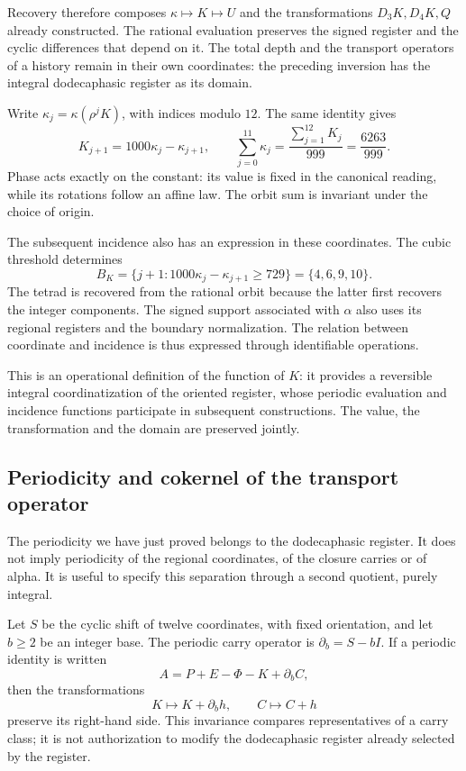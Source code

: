 Recovery therefore composes \(\kappa\mapsto K\mapsto U\)
and the transformations \(D_3K,D_4K,Q\) already constructed. The rational
evaluation preserves the signed register and the cyclic differences that
depend on it. The total depth and the transport operators of
a history remain in their own coordinates: the preceding inversion
has the integral dodecaphasic register as its domain.

Write \(\kappa_j=\kappa(\rho^jK)\), with indices modulo \(12\).
The same identity gives
\[
 K_{j+1}=1000\kappa_j-\kappa_{j+1},\qquad
 \sum_{j=0}^{11}\kappa_j=\frac{\sum_{j=1}^{12}K_j}{999}
 =\frac{6263}{999}.
\]
Phase acts exactly on the constant: its value is fixed
in the canonical reading, while its rotations follow an affine law.
The orbit sum is invariant under the choice of origin.

The subsequent incidence also has an expression in these
coordinates. The cubic threshold determines
\[
 B_K=\{j+1:1000\kappa_j-\kappa_{j+1}\ge729\}
 =\{4,6,9,10\}.
\]
The tetrad is recovered from the rational orbit because the latter
first recovers the integer components. The signed support associated
with \(\alpha\) also uses its regional registers and the boundary
normalization. The relation between coordinate and incidence is thus
expressed through identifiable operations.

This is an operational definition of the function of \(K\): it provides
a reversible integral coordinatization of the oriented register, whose
periodic evaluation and incidence functions participate in
subsequent constructions. The value, the transformation and the domain
are preserved jointly.



\subsection{Periodicity and cokernel of the transport operator}
\label{x_reciprocidad:subsec:k-clase-acarreo}

The periodicity we have just proved belongs to the dodecaphasic register. It does not imply
periodicity of the regional coordinates, of the closure carries
or of alpha. It is useful to specify this separation through a second
quotient, purely integral.

Let \(S\) be the cyclic shift of twelve coordinates, with fixed
orientation, and let \(b\geq2\) be an integer base. The periodic carry
operator is \(\partial_b=S-bI\). If a periodic identity is written
\[
 A=P+E-\Phi-K+\partial_bC,
\]
then the transformations
\[
 K\longmapsto K+\partial_bh,\qquad C\longmapsto C+h
\]
preserve its right-hand side. This invariance compares representatives of a
carry class; it is not authorization to modify the dodecaphasic register already
selected by the register.

